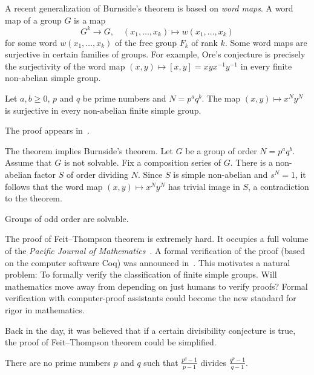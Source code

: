 A recent generalization of Burnside's theorem
is based on \emph{word maps}. A word map
of a group $G$ is a map 
\[
G^k\to G,\quad 
(x_1,\dots,x_k)\mapsto w(x_1,\dots,x_k)
\]
for some word $w(x_1,\dots,x_k)$ of the free group $F_k$ of rank $k$. 
Some word maps are surjective in certain families of groups. For example, 
Ore's conjecture is precisely the surjectivity of the word map
$(x,y)\mapsto [x,y]=xyx^{-1}y^{-1}$ in every finite non-abelian simple 
group. 

\begin{theorem}
    Let $a,b\geq0$, $p$ and $q$ be prime numbers and $N=p^aq^b$. The map 
    $(x,y)\mapsto x^Ny^N$ is surjective in every non-abelian 
    finite simple group. 
\end{theorem}

The proof appears in~\cite{MR3827208}. 

The theorem implies Burnside's theorem. Let $G$ be a group of order
$N=p^aq^b$. Assume that $G$ is not solvable. 
Fix a composition series of $G$. There is a non-abelian factor $S$ 
of order dividing $N$. Since 
$S$ is simple non-abelian and $s^N=1$, it follows that the word map
$(x,y)\mapsto x^Ny^N$ has trivial image in $S$, a contradiction 
to the theorem. 

\begin{theorem}
    Groups of odd order are solvable. 
\end{theorem}

The proof of Feit--Thompson theorem is extremely hard. 
It occupies a full volume of the 
\emph{Pacific Journal of Mathematics}~\cite{MR166261}. 
A formal verification of the proof 
(based on the computer software Coq) 
was announced in~\cite{MR3111271}.  This motivates a natural problem: To formally verify 
the classification of finite simple groups.  
Will mathematics move away from depending on just humans to verify proofs? Formal verification with computer-proof assistants 
could become the new standard for rigor in mathematics. 

Back in the day, it was believed that if a certain divisibility 
conjecture is true, 
the proof of Feit--Thompson theorem 
could be simplified. 

\begin{conjecture}
    There are no prime numbers $p$ and $q$ such that
    $\frac {p^{q}-1}{p-1}$ divides $\frac{q^{p} - 1}{q - 1}$. 
\end{conjecture}


